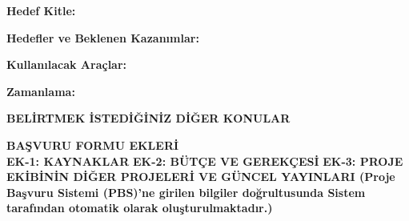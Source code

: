 \documentclass[a4paper]{article}
\begin{document}
\begin{kutudortlu}
\noindent\textbf{Hedef Kitle:} %

\tcbline*

\noindent\textbf{Hedefler ve Beklenen Kazanımlar:} %

\tcbline*

\noindent\textbf{Kullanılacak Araçlar:} %

\tcbline*

\noindent\textbf{Zamanlama:} %

\end{kutudortlu}

\textbf{\large BELİRTMEK İSTEDİĞİNİZ DİĞER KONULAR}\\


\begin{framed}

\end{framed}

\noindent\textbf{\large BAŞVURU FORMU EKLERİ}\\

\noindent\textbf{EK-1: KAYNAKLAR}\newline
\noindent\textbf{EK-2: BÜTÇE VE GEREKÇESİ}\newline
\noindent\textbf{EK-3: PROJE EKİBİNİN DİĞER PROJELERİ VE GÜNCEL YAYINLARI (Proje Başvuru Sistemi (PBS)’ne girilen
bilgiler doğrultusunda Sistem tarafından otomatik olarak oluşturulmaktadır.)}




\clearpage
\setlength{\parindent}{0pt}            
\setcounter{page}{1}

%
\end{document}
